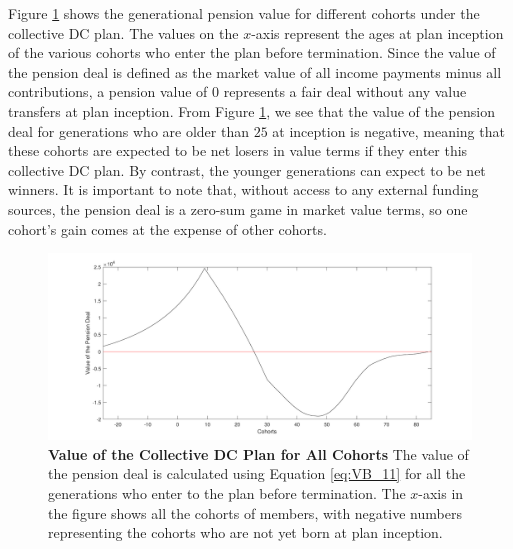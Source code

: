 \documentclass{sfuthesis}
\numberwithin{equation}{chapter}
\begin{document}
	
        \justify
		Figure \ref{fig:Value of the CDC Plan for All Cohorts} shows the generational pension value for different cohorts under the collective DC plan. The values on the $x$-axis represent the ages at plan inception of the various cohorts who enter the plan before termination. Since the value of the pension deal is defined as the market value of all income payments minus all contributions, a pension value of $0$ represents a fair deal without any value transfers at plan inception. From Figure \ref{fig:Value of the CDC Plan for All Cohorts}, we see that the value of the pension deal for generations who are older than $25$ at inception is negative, meaning that these cohorts are expected to be net losers in value terms if they enter this collective DC plan. By contrast, the younger generations can expect to be net winners. It is important to note that, without access to any external funding sources, the pension deal is a zero-sum game in market value terms, so one cohort's gain comes at the expense of other cohorts.
	    \begin{figure}[h]
			\includegraphics[width=1\linewidth]{ResultPlot/VPension.pdf} 
			\caption[Value of the Collective DC Plan for All Cohorts]{\textbf{Value of the Collective DC Plan for All Cohorts}
				\vspace{-0.4cm}
				\newline\footnotesize \justify The value of the pension deal is calculated using Equation \eqref{eq:VB_11} for all the generations who enter to the plan before termination. The $x$-axis in the figure shows all the cohorts of members, with negative numbers representing the cohorts who are not yet born at plan inception.}
			\label{fig:Value of the CDC Plan for All Cohorts}
		\end{figure}
	
	\vspace{-0.4cm}
	
\end{document}
